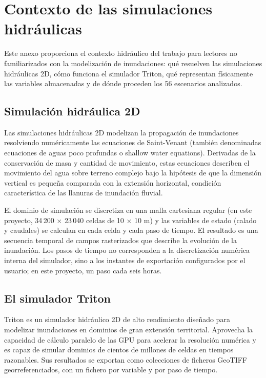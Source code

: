 \chapter{Contexto de las simulaciones hidráulicas}\label{anexo-c.-contexto-de-las-simulaciones-hidraulicas}

Este anexo proporciona el contexto hidráulico del trabajo para lectores no familiarizados con la modelización de inundaciones: qué resuelven las simulaciones hidráulicas 2D, cómo funciona el simulador Triton, qué representan físicamente las variables almacenadas y de dónde proceden los 56 escenarios analizados.

\section{Simulación hidráulica 2D}\label{c.1-simulacion-hidraulica-2d}

Las simulaciones hidráulicas 2D modelizan la propagación de inundaciones resolviendo numéricamente las ecuaciones de Saint-Venant (también denominadas ecuaciones de aguas poco profundas o shallow water equations). Derivadas de la conservación de masa y cantidad de movimiento, estas ecuaciones describen el movimiento del agua sobre terreno complejo bajo la hipótesis de que la dimensión vertical es pequeña comparada con la extensión horizontal, condición característica de las llanuras de inundación fluvial.

El dominio de simulación se discretiza en una malla cartesiana regular (en este proyecto, 34\,200 $\times$ 23\,040 celdas de 10 $\times$ 10 m) y las variables de estado (calado y caudales) se calculan en cada celda y cada paso de tiempo. El resultado es una secuencia temporal de campos rasterizados que describe la evolución de la inundación. Los pasos de tiempo no corresponden a la discretización numérica interna del simulador, sino a los instantes de exportación configurados por el usuario; en este proyecto, un paso cada seis horas.

\section{El simulador Triton}\label{c.2-el-simulador-triton}

Triton \cite{triton} es un simulador hidráulico 2D de alto rendimiento diseñado para modelizar inundaciones en dominios de gran extensión territorial. Aprovecha la capacidad de cálculo paralelo de las GPU para acelerar la resolución numérica y es capaz de simular dominios de cientos de millones de celdas en tiempos razonables. Sus resultados se exportan como colecciones de ficheros GeoTIFF georreferenciados, con un fichero por variable y por paso de tiempo.

